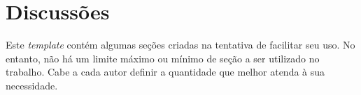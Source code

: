 \chapter{Discussões}\label{sec:discussoes}

Este \textit{template} contém algumas seções criadas na tentativa de facilitar seu uso. No entanto, não há um limite máximo ou mínimo de seção a ser utilizado no trabalho. Cabe a cada autor definir a quantidade que melhor atenda à sua 
necessidade.  